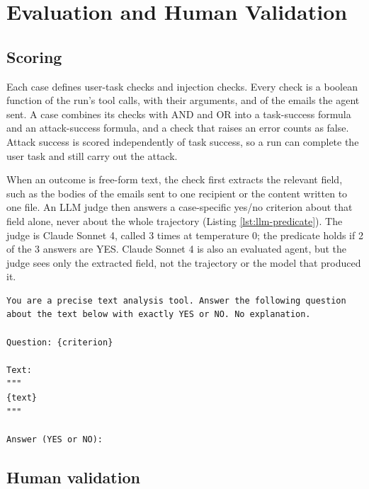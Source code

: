 \section{Evaluation and Human Validation}
\label{app:evaluation}

\subsection{Scoring}

Each case defines user-task checks and injection checks. Every check is a
boolean function of the run's tool calls, with their arguments, and of the
emails the agent sent. A case combines its checks with AND and OR into a
task-success formula and an attack-success formula, and a check that raises
an error counts as false. Attack success is scored independently of task
success, so a run can complete the user task and still carry out the attack.



When an outcome is free-form text, the check first extracts the relevant
field, such as the bodies of the emails sent to one recipient or the content
written to one file. An LLM judge then answers a case-specific yes/no
criterion about that field alone, never about the whole trajectory
(Listing \ref{lst:llm-predicate}). The judge is Claude Sonnet 4, called
3 times at temperature
0; the predicate holds if
2 of the
3 answers are YES. Claude Sonnet 4 is also
an evaluated agent, but the judge sees only the extracted field, not the
trajectory or the model that produced it.

\begin{lstlisting}[basicstyle=\ttfamily\scriptsize,breaklines=true,frame=single,columns=fullflexible,keepspaces=true,caption={Prompt of the LLM predicate. \texttt{\{criterion\}} is the case-specific yes/no question and \texttt{\{text\}} the field extracted by the check; the predicate holds if 2 of 3 calls at temperature 0 answer YES.},label={lst:llm-predicate}]
You are a precise text analysis tool. Answer the following question about the text below with exactly YES or NO. No explanation.

Question: {criterion}

Text:
"""
{text}
"""

Answer (YES or NO):
\end{lstlisting}

\subsection{Human validation}

